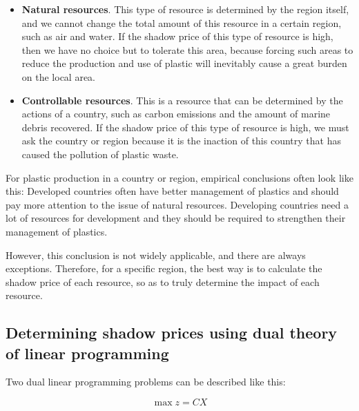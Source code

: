\documentclass{mcmthesis}
\begin{document}
\begin{itemize}
	\item \textbf{Natural resources}. This type of resource is determined by the region itself, and we cannot change the total amount of this resource in a certain region, such as air and water. If the shadow price of this type of resource is high, then we have no choice but to tolerate this area, because forcing such areas to reduce the production and use of plastic will inevitably cause a great burden on the local area.
	\item \textbf{Controllable resources}. This is a resource that can be determined by the actions of a country, such as carbon emissions and the amount of marine debris recovered. If the shadow price of this type of resource is high, we must ask the country or region because it is the inaction of this country that has caused the pollution of plastic waste.
\end{itemize}

For plastic production in a country or region, empirical conclusions often look like this: Developed countries often have better management of plastics and should pay more attention to the issue of natural resources. Developing countries need a lot of resources for development and they should be required to strengthen their management of plastics.

However, this conclusion is not widely applicable, and there are always exceptions. Therefore, for a specific region, the best way is to calculate the shadow price of each resource, so as to truly determine the impact of each resource.



\subsection{Determining shadow prices using dual theory of linear programming}

Two dual linear programming problems can be described like this\cite{Hillier}:

\begin{equation}
\max z = CX
\end{equation}
\end{document}
